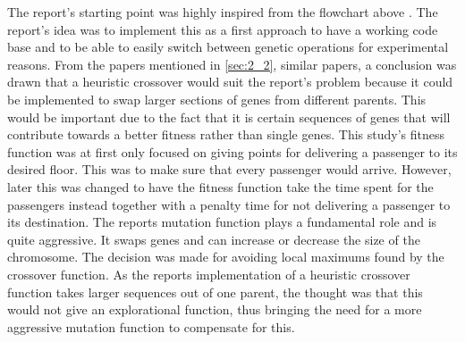 
The report's starting point was highly inspired from the flowchart above \cite{tartan2016genetic}. The report's idea was to implement this as a first approach to have a working code base and to be able to easily switch between genetic operations for experimental reasons. From the papers mentioned in \ref{sec:2_2}, similar papers, a conclusion was drawn that a heuristic crossover would suit the report's problem because it could be implemented to swap larger sections of genes from different parents. This would be important due to the fact that it is certain sequences of genes that will contribute towards a better fitness rather than single genes. This study's fitness function was at first only focused on giving points for delivering a passenger to its desired floor. This was to make sure that every passenger would arrive. However, later this was changed to have the fitness function take the time spent for the passengers instead together with a penalty time for not delivering a passenger to its destination. The reports mutation function plays a fundamental role and is quite aggressive. It swaps genes and can increase or decrease the size of the chromosome. The decision was made for avoiding local maximums found by the crossover function. As the reports implementation of a heuristic crossover function takes larger sequences out of one parent, the thought was that this would not give an explorational function, thus bringing the need for a more aggressive mutation function to compensate for this.
